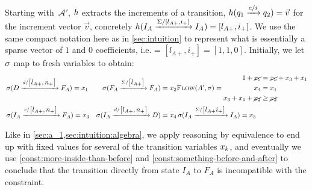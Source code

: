 Starting with~$\mathcal{A}'$, $h$ extracts the increments of a transition, $h(q_1 \xrightarrow{c / i} q_2) = \Vec{v}$ for the increment
vector $\Vec{v}$, concretely $h(I_A \xrightarrow{\Sigma / \left[ l_{A+}, i_+
\right]} I_A) = \left[ l_{A+}, i_+ \right]$. We use the same compact notation
here as in \cref{sec:intuition} to represent what is essentially a sparse vector
of $1$ and $0$ coefficients, i.e. = $\left[ l_{A+}, i_+ \right] = \left[1, 1,
0\right]$. Initially, we let $\operatorname{\sigma}$ map to fresh variables to obtain:
\begin{equation}\label{eq:single-filter}
    \begin{aligned}
      & \operatorname{\sigma}(D \xrightarrow{d/\begin{bmatrix}l_{A+}, n_+\end{bmatrix}} F_A) = x_1
        & \operatorname{\sigma}(F_A \xrightarrow{\Sigma/\begin{bmatrix} l_{A+} \end{bmatrix}} F_A ) = x_2   
        & \textsc{Flow}(A', \operatorname{\sigma})  = \begin{aligned}
                       1 + \cancel{x_5} &= \cancel{x_5} + x_3 + x_1\\
                    x_4 &= x_1 \\
                    x_3 + x_1 + \cancel{x_2} &\geq \cancel{x_2}  \\
                    \end{aligned} \\
      &\operatorname{\sigma}(I_A \xrightarrow{c/\begin{bmatrix}l_{A+}, n_+\end{bmatrix}} F_A ) =  x_3 
          & \operatorname{\sigma}(I_A \xrightarrow{d/\begin{bmatrix}l_{A+}, n_+\end{bmatrix}} D) = x_4
          & \operatorname{\sigma}(I_A \xrightarrow{\Sigma/\begin{bmatrix} l_{A+} i_+\end{bmatrix}} I_A) = x_5  
    \end{aligned}
\end{equation}

Like in \cref{sec:a_1,sec:intuition:algebra}, we apply reasoning by equivalence
  to end up with fixed values for several of the transition variables
  $x_k$, and eventually we use \cref{const:more-inside-than-before}
  and \cref{const:something-before-and-after} to conclude that the transition
  directly from state $I_{A}$ to $F_{A}$ is incompatible with the constraint.

